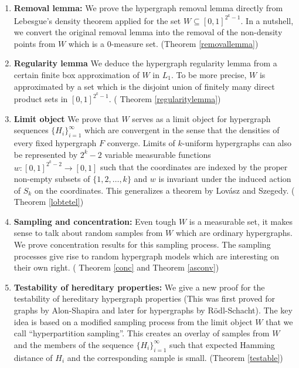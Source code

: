 \documentclass [11pt] {article}
\def\to{\rightarrow}
\begin{document}
\begin{enumerate}
\item {\bf Removal lemma:} We prove the hypergraph removal lemma 
directly from Lebesgue's density theorem applied for the set 
$W\subseteq [0,1]^{2^k-1}$. In a nutshell, we convert the 
original removal lemma into the removal of the non-density points from $W$ 
which is a $0$-measure set. (Theorem \ref{removallemma})
    
\item {\bf Regularity lemma} We deduce the hypergraph regularity lemma from a
  certain finite box approximation of $W$ in $L_1$. To be more precise, 
$W$ is approximated by a set which is the disjoint union of finitely 
many direct product sets in $[0,1]^{2^k-1}$. ( Theorem \ref{regularitylemma})

\item {\bf Limit object} We prove that $W$ serves as a limit object for 
hypergraph sequences $\{H_i\}_{i=1}^\infty$ which are convergent in the sense
that the densities of every fixed hypergraph $F$ converge. 
Limits of $k$-uniform hypergraphs can also be represented by $2^k-2$
variable measurable functions $w:[0,1]^{2^k-2}\to[0,1]$ such that the
coordinates are indexed by the proper non-empty subsets of $\{1,2,\dots,k\}$
and $w$ is invariant under the induced action of $S_k$ on the coordinates. 
This generalizes a theorem by Lov\'asz and Szegedy. ( Theorem \ref{lobtetel})

    
\item {\bf Sampling and concentration:} Even tough $W$ is a measurable set, it
  makes sense to talk about random samples from $W$ which are ordinary
  hypergraphs.
 We prove concentration results for this sampling process. 
The sampling processes give rise to random hypergraph models which are 
interesting on their own right. ( Theorem \ref{conc} and Theorem \ref{asconv})

\item {\bf Testability of hereditary properties:} We give a new proof for the
  testability of hereditary hypergraph properties (This was 
first proved for graphs by Alon-Shapira and later for hypergraphs by
R\"odl-Schacht). The key idea is based on a modified sampling process 
from the limit object $W$ that we call ``hyperpartition sampling''. This
creates an overlay of samples from $W$ and the members of the 
sequence $\{H_i\}_{i=1}^\infty$ such that expected Hamming distance of $H_i$ 
and the corresponding sample is small. (Theorem \ref{testable})



\end{enumerate}
\end{document}
